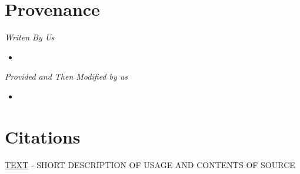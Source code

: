 \documentclass[12pt,a4paper,final]{article}
\begin{document}
\section*{Provenance}

\begin{center} \emph{Writen By Us} \end{center}
\begin{itemize}[noitemsep]
    \item
\end{itemize}

\begin{center} \emph{Provided and Then Modified by us} \end{center}
\begin{itemize}[noitemsep]
	\item
\end{itemize}


\section*{Citations}

\noindent
\href{HYPERLINK}{TEXT}
\newline - SHORT DESCRIPTION OF USAGE AND CONTENTS OF SOURCE
\end{document}
